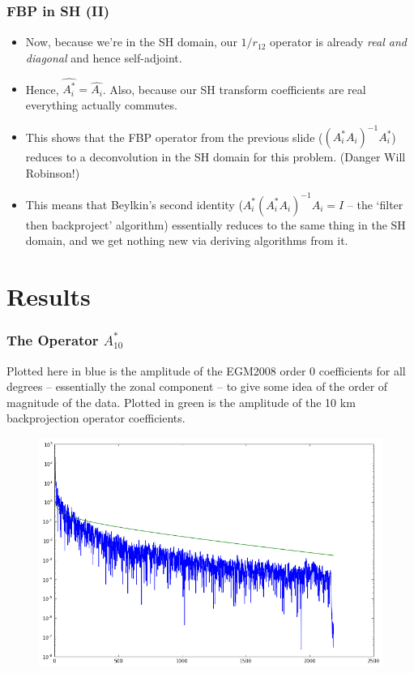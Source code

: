 \documentclass[aspectratio=43,mathserif]{beamer}
\begin{document}
\begin{frame}
\frametitle{FBP in SH (II)}
\begin{itemize}
\item Now, because we're in the SH domain, our \(\widehat{1/r_{12}}\) operator is already \emph{real and diagonal} and hence self-adjoint.

\item Hence, \(\widehat{A_i^*} = \widehat{A_i}\).  Also, because our SH transform coefficients are real everything actually commutes.

\item This  shows that the FBP  operator from the previous slide  (\((A_i^* A_i)^{-1} A_i^*\)) reduces to a deconvolution in the SH domain for this problem. (Danger Will Robinson!)


\item This means that Beylkin's second identity (\(A_i^* (A_i^* A_i)^{-1}   A_i = I \) -- the `filter then backproject' algorithm) essentially reduces to the same thing in the SH domain, and we get nothing new via deriving algorithms from it.


\end{itemize}

\end{frame}

\section{Results}
\begin{frame}
\frametitle{The Operator \(A_{10}^*\)}

Plotted here in blue is the amplitude of the EGM2008 order 0 coefficients for all degrees -- essentially the zonal component -- to give some idea of the order of magnitude of the data. Plotted in green is the amplitude of the 10 km backprojection operator coefficients.

\begin{figure}
\includegraphics[width=0.7\linewidth]{1_r_10.png}
\end{figure}
\end{frame}
\end{document}
